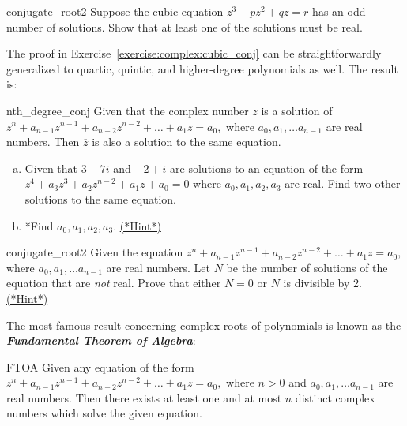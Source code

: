 \begin{exercise}{conjugate_root2}
Suppose the cubic equation $z^3 + pz^2 + qz = r$ has an odd number of solutions. Show that at least one of the solutions must be real.
\end{exercise}


The proof in Exercise~\ref{exercise:complex:cubic_conj} can be straightforwardly generalized to quartic, quintic, and higher-degree polynomials as well. The result is:

\begin{prop}{nth_degree_conj}   Given that the complex number $z$ is a solution of $z^n + a_{n-1}z^{n-1} + a_{n-2} z^{n-2} + \ldots + a_1 z =a_0,$ where $a_0, a_1, \ldots a_{n-1}$ are real numbers. Then $\overline{z}$ is also a solution to the same equation. 
\end{prop}

\begin{exercise}{62} 
\begin{enumerate}[(a)]
\item
Given that $3 - 7i$ and $-2+i$ are solutions to an equation of the form $z^4 + a_{3}z^{3} + a_{2} z^{n-2}+ a_1 z + a_0 = 0$ where $a_0, a_1, a_2, a_3$ are real. Find two other solutions to the same equation.
\item
*Find $a_0, a_1, a_2, a_3$. 
\hyperref[sec:complex:hints]{(*Hint*)}
\end{enumerate}
\end{exercise}

\begin{exercise}{conjugate_root2}
Given the equation  $z^n + a_{n-1}z^{n-1} + a_{n-2} z^{n-2} + \ldots + a_1 z =a_0,$ where $a_0, a_1, \ldots a_{n-1}$ are real numbers. Let $N$ be the number of solutions of the equation that are \emph{not} real. Prove that either $N=0$ or $N$ is divisible by 2. 
\hyperref[sec:complex:hints]{(*Hint*)}
\end{exercise}

The most famous result concerning complex roots of polynomials is known as the {\bf \emph{Fundamental Theorem of Algebra}}:

\begin{prop}{FTOA} Given any equation of the form $z^n + a_{n-1}z^{n-1} + a_{n-2} z^{n-2} + \ldots + a_1 z =a_0,$ where $n>0$ and $a_0, a_1, \ldots a_{n-1}$ are real numbers. Then there exists at least one and at most $n$ distinct complex numbers which solve the given equation. 
\end{prop}

